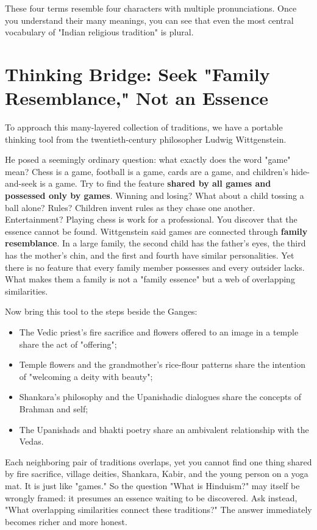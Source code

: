 These four terms resemble four characters with multiple pronunciations. Once you understand their many meanings, you can see that even the most central vocabulary of "Indian religious tradition" is plural.

\section[Thinking Bridge: Family Resemblance]{Thinking Bridge: Seek "Family Resemblance," Not an Essence}
To approach this many-layered collection of traditions, we have a portable thinking tool from the twentieth-century philosopher Ludwig Wittgenstein.

He posed a seemingly ordinary question: what exactly does the word "game" mean? Chess is a game, football is a game, cards are a game, and children's hide-and-seek is a game. Try to find the feature \textbf{shared by all games and possessed only by games}. Winning and losing? What about a child tossing a ball alone? Rules? Children invent rules as they chase one another. Entertainment? Playing chess is work for a professional. You discover that the essence cannot be found. Wittgenstein said games are connected through \textbf{family resemblance}. In a large family, the second child has the father's eyes, the third has the mother's chin, and the first and fourth have similar personalities. Yet there is no feature that every family member possesses and every outsider lacks. What makes them a family is not a "family essence" but a web of overlapping similarities.

Now bring this tool to the steps beside the Ganges:

\begin{itemize}
\item The Vedic priest's fire sacrifice and flowers offered to an image in a temple share the act of "offering";
\item Temple flowers and the grandmother's rice-flour patterns share the intention of "welcoming a deity with beauty";
\item Shankara's philosophy and the Upanishadic dialogues share the concepts of Brahman and self;
\item The Upanishads and bhakti poetry share an ambivalent relationship with the Vedas.
\end{itemize}
Each neighboring pair of traditions overlaps, yet you cannot find one thing shared by fire sacrifice, village deities, Shankara, Kabir, and the young person on a yoga mat. It is just like "games." So the question "What is Hinduism?" may itself be wrongly framed: it presumes an essence waiting to be discovered. Ask instead, "What overlapping similarities connect these traditions?" The answer immediately becomes richer and more honest.

